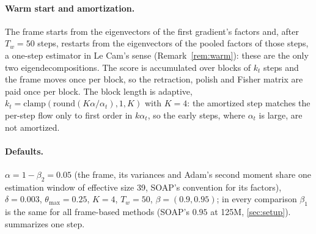 \paragraph{Warm start and amortization.}
The frame starts from the eigenvectors of the first gradient's factors and, after $T_w=50$ steps,
restarts from the eigenvectors of the pooled factors of those steps, a one-step estimator in Le
Cam's sense (Remark~\ref{rem:warm}): these are the only two eigendecompositions. The score is
accumulated over blocks of $k_t$ steps and the frame moves once per block, so the retraction,
polish and Fisher matrix are paid once per block. The block length is adaptive,
$k_t=\mathrm{clamp}(\mathrm{round}(K\alpha/\alpha_t),1,K)$ with $K=4$: the amortized step matches
the per-step flow only to first order in $k\alpha_t$, so the early steps, where $\alpha_t$ is
large, are not amortized.

\paragraph{Defaults.}
$\alpha=1-\beta_2=0.05$ (the frame, its variances and Adam's second moment share one estimation
window of effective size 39, SOAP's convention for its factors), $\delta=0.003$,
$\theta_{\max}=0.25$, $K=4$, $T_w=50$, $\beta=(0.9,0.95)$; in every comparison $\beta_1$ is the
same for all frame-based methods (SOAP's $0.95$ at 125M, \cref{sec:setup}).  summarizes one step.

